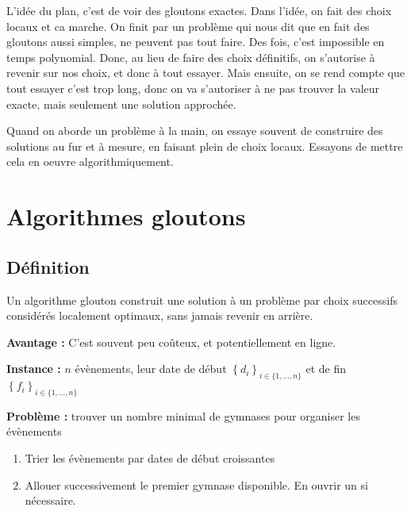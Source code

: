 
\begin{com}
	L'idée du plan, c'est de voir des gloutons exactes. Dans l'idée, on fait des choix locaux et ca marche. On finit par un problème qui nous dit que en fait des gloutons aussi simples, ne peuvent pas tout faire. Des fois, c'est impossible en temps polynomial. Donc, au lieu de faire des choix définitifs, on s'autorise à revenir sur nos choix, et donc à tout essayer. Mais ensuite, on se rend compte que tout essayer c'est trop long, donc on va s'autoriser à ne pas trouver la valeur exacte, mais seulement une solution approchée.
\end{com}

Quand on aborde un problème à la main, on essaye souvent de construire des solutions au fur et à mesure, en faisant plein de choix locaux. Essayons de mettre cela en oeuvre algorithmiquement.

\section{Algorithmes gloutons}

\subsection{Définition}

\begin{definition}
	Un algorithme glouton construit une solution à un problème par choix successifs considérés localement optimaux, sans jamais revenir en arrière.
\end{definition}

\textbf{Avantage :} C'est souvent peu coûteux, et potentiellement en ligne.

\begin{definition}[Gymnases]\enspace
	
	\textbf{Instance :} $n$ évènements, leur date de début $\left\{d_i\right\}_{i \in \{1, \dots, n\}}$ et de fin $\left\{f_i\right\}_{i \in \{1, \dots, n\}}$
	
	\textbf{Problème :} trouver un nombre minimal de gymnases pour organiser les évènements
\end{definition}

\begin{algo}\enspace
	\label{12-algo1}
	\begin{enumerate}
		\item Trier les évènements par dates de début croissantes
		\item Allouer successivement le premier gymnase disponible. En ouvrir un si nécessaire.
	\end{enumerate}
\end{algo}

